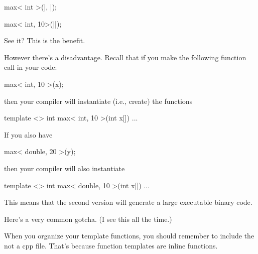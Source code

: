 \begin{consolethree}[escapeinside=||]
max< int >(|, |);
\end{consolethree}

\begin{consolethree}[escapeinside=||]
max< int, 10>(||);
\end{consolethree}

See it? This is the benefit.

However there's a disadvantage. Recall that if you make the following
function call in your code:

\begin{console}
max< int, 10 >(x);
\end{console}

then your compiler will instantiate (i.e., create) the functions

\begin{consolethree}[escapeinside=||]
template <>
int max< int, 10 >(int x[])
{
    ...
}
\end{consolethree}

If you also have

\begin{console}
max< double, 20 >(y);
\end{console}

then your compiler will also instantiate

\begin{consolethree}[escapeinside=||]
template <>
int max< double, 10 >(int x[])
{
    ...
}
\end{consolethree}

This means that the second version will generate a large executable
binary code.





\newpage{}

Here's a very common gotcha. (I see this all the time.)

When you organize your template functions, you should remember to
include the  not a cpp file. That's because function templates are inline functions.



\newpage{}

